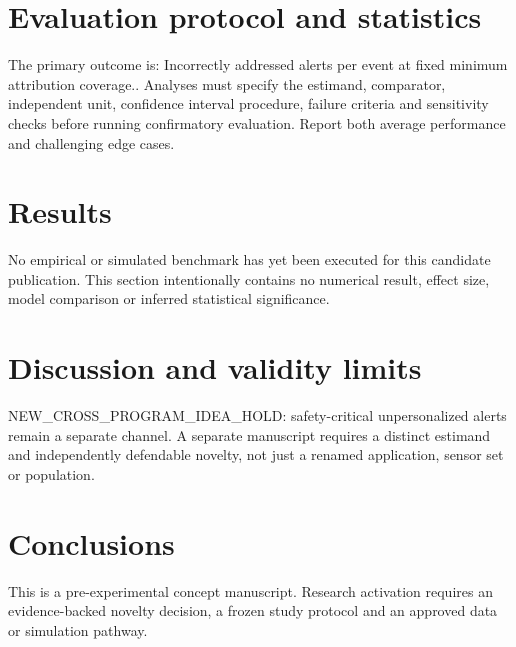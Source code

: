 \documentclass[11pt,a4paper]{article}
\begin{document}
\section{Evaluation protocol and statistics}
The primary outcome is: Incorrectly addressed alerts per event at fixed minimum attribution coverage.. Analyses must specify the estimand, comparator, independent unit, confidence interval procedure, failure criteria and sensitivity checks before running confirmatory evaluation. Report both average performance and challenging edge cases.
\section{Results}
No empirical or simulated benchmark has yet been executed for this candidate publication. This section intentionally contains no numerical result, effect size, model comparison or inferred statistical significance.
\section{Discussion and validity limits}
NEW\_CROSS\_PROGRAM\_IDEA\_HOLD: safety-critical unpersonalized alerts remain a separate channel. A separate manuscript requires a distinct estimand and independently defendable novelty, not just a renamed application, sensor set or population.
\section{Conclusions}
This is a pre-experimental concept manuscript. Research activation requires an evidence-backed novelty decision, a frozen study protocol and an approved data or simulation pathway.
\end{document}
